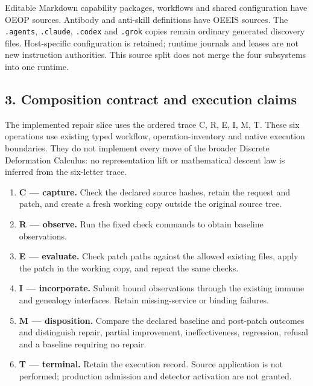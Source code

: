 \documentclass[
  11pt,
]{article}
\newcommand{\passthrough}[1]{#1}
\providecommand{\tightlist}{%
  \setlength{\itemsep}{0pt}\setlength{\parskip}{0pt}}
\begin{document}
Editable Markdown capability packages, workflows and shared
configuration have OEOP sources. Antibody and anti-skill definitions
have OEEIS sources. The \passthrough{\lstinline!.agents!},
\passthrough{\lstinline!.claude!}, \passthrough{\lstinline!.codex!} and
\passthrough{\lstinline!.grok!} copies remain ordinary generated
discovery files. Host-specific configuration is retained; runtime
journals and leases are not new instruction authorities. This source
split does not merge the four subsystems into one runtime.

\subsection{3. Composition contract and execution
claims}\label{composition-contract-and-execution-claims}

The implemented repair slice uses the ordered trace C, R, E, I, M, T.
These six operations use existing typed workflow, operation-inventory
and native execution boundaries. They do not implement every move of the
broader Discrete Deformation Calculus: no representation lift or
mathematical descent law is inferred from the six-letter trace.

\begin{enumerate}
\def\labelenumi{\arabic{enumi}.}
\tightlist
\item
  \textbf{C --- capture.} Check the declared source hashes, retain the
  request and patch, and create a fresh working copy outside the
  original source tree.
\item
  \textbf{R --- observe.} Run the fixed check commands to obtain
  baseline observations.
\item
  \textbf{E --- evaluate.} Check patch paths against the allowed
  existing files, apply the patch in the working copy, and repeat the
  same checks.
\item
  \textbf{I --- incorporate.} Submit bound observations through the
  existing immune and genealogy interfaces. Retain missing-service or
  binding failures.
\item
  \textbf{M --- disposition.} Compare the declared baseline and
  post-patch outcomes and distinguish repair, partial improvement,
  ineffectiveness, regression, refusal and a baseline requiring no
  repair.
\item
  \textbf{T --- terminal.} Retain the execution record. Source
  application is not performed; production admission and detector
  activation are not granted.
\end{enumerate}
\end{document}
